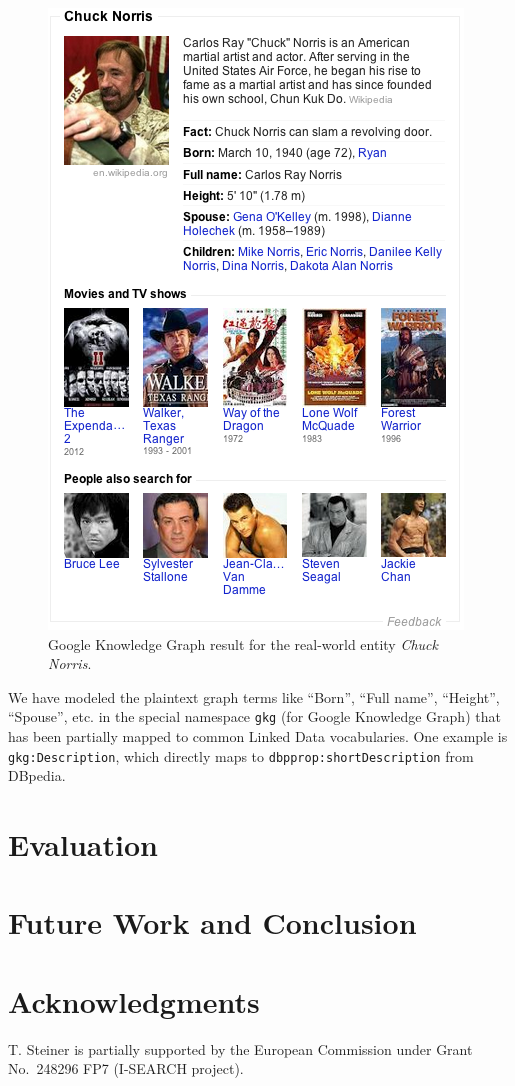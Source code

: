 \documentclass[runningheads,a4paper]{llncs}
\begin{document}
\begin{figure}[htb!]
  \begin{center}
   \includegraphics[width=0.5\linewidth]{./screenshot.png}
  \end{center}  
  \caption{Google Knowledge Graph result for the real-world entity \emph{Chuck Norris}.}
  \label{fig:screenshot}
\end{figure}

We have modeled the plaintext graph terms
like ``Born'', ``Full name'', ``Height'', ``Spouse'', etc.
in the special namespace \texttt{gkg} (for Google Knowledge Graph)
that has been partially mapped to common Linked Data vocabularies.
One example is \texttt{gkg:Description},
which directly maps to \texttt{dbpprop:shortDescription} from DBpedia.

\section{Evaluation}

\section{Future Work and Conclusion}

\section*{Acknowledgments}
T. Steiner is partially supported by the European Commission
under Grant No.~248296 FP7 (\mbox{I-SEARCH} project).



\end{document}
